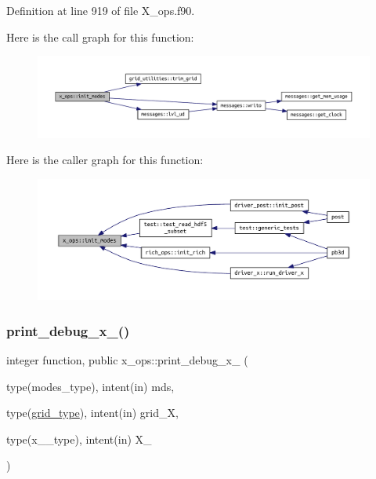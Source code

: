 Definition at line 919 of file X\+\_\+ops.\+f90.

Here is the call graph for this function\+:\nopagebreak
\begin{figure}[H]
\begin{center}
\leavevmode
\includegraphics[width=350pt]{namespacex__ops_a73a80c582379669f8e07b09dd7456878_cgraph}
\end{center}
\end{figure}
Here is the caller graph for this function\+:\nopagebreak
\begin{figure}[H]
\begin{center}
\leavevmode
\includegraphics[width=350pt]{namespacex__ops_a73a80c582379669f8e07b09dd7456878_icgraph}
\end{center}
\end{figure}
\mbox{\label{namespacex__ops_a8bdd87db80570a01cf35ca50184ae879}} 
\subsubsection{\texorpdfstring{print\+\_\+debug\+\_\+x\+\_()}{print\_debug\_x\_1()}}
{\footnotesize\ttfamily integer function, public x\+\_\+ops\+::print\+\_\+debug\+\_\+x\+\_ (\begin{DoxyParamCaption}\item[{type(modes\+\_\+type), intent(in)}]{mds,  }\item[{type(\hyperlink{structgrid__vars_1_1grid__type}{grid\+\_\+type}), intent(in)}]{grid\+\_\+X,  }\item[{type(x\+\_\+1\+\_\+type), intent(in)}]{X\+\_ }\end{DoxyParamCaption})}



